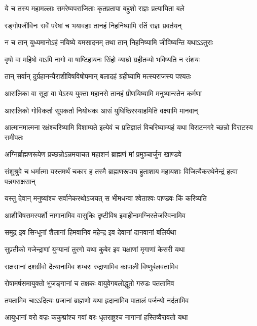 \twolineshloka
{ये च तस्य महामल्लाः समरेष्वपराजिताः}
{कृतप्रतापा बहुशो राज्ञः प्रत्यायिता बले}


\twolineshloka
{रङ्गोपजीविनः सर्वे परेषां च भयावहाः}
{तानहं निहनिष्यामि रतिं राज्ञः प्रवर्तयन्}


\twolineshloka
{न च तान् युध्यमानोऽहं नयिष्ये यमसादनम्}
{तथा तान् निहनिष्यामि जीविष्यन्ति यथाऽऽतुराः}


\twolineshloka
{वृषो वा महिषो वाऽपि नागो वा षाष्टिहायनः}
{सिंहो व्याघ्रो ग्रहीतव्यो भविष्यति न संशयः}


\twolineshloka
{तान् सर्वान् दुर्ग्रहानन्यैराशीविषविषोपमान्}
{बलादहं ग्रहीष्यामि मत्स्यराजस्य पश्यतः}


\twolineshloka
{आरालिका वा सूदा वा येऽस्य युक्ता महानसे}
{तानहं प्रीणयिष्यामि मनुष्यान्स्तेन कर्मणा}


\twolineshloka
{आरालिको गोविकर्ता सूपकर्ता नियोधकः}
{आसं युधिष्ठिरस्याहमिति वक्ष्यामि मानवान्}


\threelineshloka
{आत्मानमात्मना रक्षंश्चरिष्यामि विशाम्पते}
{इत्येवं च प्रतिज्ञातं विचरिष्याम्यहं यथा}
{विराटनगरे च्छन्नो विराटस्य समीपतः}




\twolineshloka
{अग्निर्ब्राह्मणरूपेण प्रच्छन्नोऽन्नमयाचत}
{महाशनं ब्राह्मणं मां प्रमुञ्चार्जुन खाण्डवे}


\threelineshloka
{संशुश्रुवे च धर्मात्मा यस्तमर्थं चकार ह}
{तस्मै ब्राह्मणरूपाय हुताशाय महायशाः}
{विजित्यैकरथेनेन्द्रं हत्वा पन्नगराक्षसान्}


\twolineshloka
{यस्तु देवान् मनुष्यांश्च सर्वानेकरथोऽजयत्}
{स भीमधन्वा श्वेताश्वः पाण्डवः किं करिष्यति}


\twolineshloka
{आशीविषसमस्पर्शो नागानामिव वासुकिः}
{दृष्टीविष इवाहीनामग्निस्तेजस्विनामिव}


\twolineshloka
{समुद्र इव सिन्धूनां शैलानां हिमवानिव}
{महेन्द्र इव देवानां दानवानां बलिर्यथा}


\twolineshloka
{सुप्रतीको गजेन्द्राणां युग्यानां तुरगो यथा}
{कुबेर इव यक्षाणां मृगाणां केसरी यथा}


\twolineshloka
{राक्षसानां दशग्रीवो दैत्यानामिव शम्बरः}
{रुद्राणामिव कापाली विष्णुर्बलवतामिव}


\twolineshloka
{रोषामर्षसमायुक्तो भुजङ्गानां च तक्षकः}
{वायुवेगबलोद्धूतो गरुडः पततामिव}


\twolineshloka
{तपतामिव चाऽऽदित्यः प्रजानां ब्राह्मणो यथा}
{ह्रदानामिव पातालं पर्जन्यो नर्दतामिव}


\twolineshloka
{आयुधानां वरो वज्रः ककुद्मांश्च गवां वरः}
{धृतराष्ट्रश्च नागानां हस्तिष्वैरावतो यथा}



